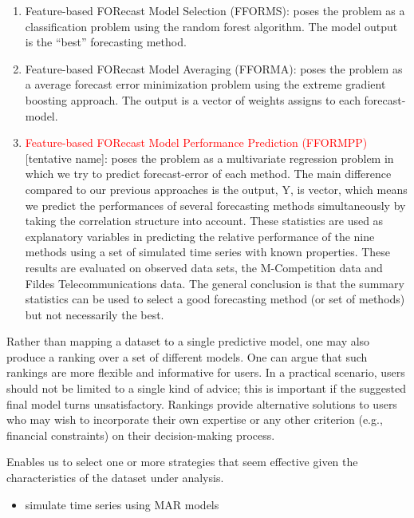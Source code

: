 \documentclass[]{article}
\providecommand{\tightlist}{%
  \setlength{\itemsep}{0pt}\setlength{\parskip}{0pt}}
\begin{document}
\begin{enumerate}
\def\labelenumi{\arabic{enumi}.}
\item
  Feature-based FORecast Model Selection (FFORMS): poses the problem as
  a classification problem using the random forest algorithm. The model
  output is the ``best'' forecasting method.
\item
  Feature-based FORecast Model Averaging (FFORMA): poses the problem as
  a average forecast error minimization problem using the extreme
  gradient boosting approach. The output is a vector of weights assigns
  to each forecast-model.
\item
  \textcolor{red}{Feature-based FORecast Model Performance Prediction (FFORMPP)}
  {[}tentative name{]}: poses the problem as a multivariate regression
  problem in which we try to predict forecast-error of each method. The
  main difference compared to our previous approaches is the output, Y,
  is vector, which means we predict the performances of several
  forecasting methods simultaneously by taking the correlation structure
  into account. These statistics are used as explanatory variables in
  predicting the relative performance of the nine methods using a set of
  simulated time series with known properties. These results are
  evaluated on observed data sets, the M-Competition data and Fildes
  Telecommunications data. The general conclusion is that the summary
  statistics can be used to select a good forecasting method (or set of
  methods) but not necessarily the best.
\end{enumerate}

Rather than mapping a dataset to a single predictive model, one may also
produce a ranking over a set of different models. One can argue that
such rankings are more flexible and informative for users. In a
practical scenario, users should not be limited to a single kind of
advice; this is important if the suggested final model turns
unsatisfactory. Rankings provide alternative solutions to users who may
wish to incorporate their own expertise or any other criterion (e.g.,
financial constraints) on their decision-making process.

Enables us to select one or more strategies that seem effective given
the characteristics of the dataset under analysis.

\begin{itemize}
\tightlist
\item
  simulate time series using MAR models
\end{itemize}
\end{document}
